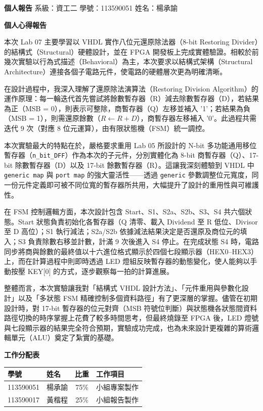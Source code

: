 \documentclass[12pt, a4paper]{article}
\begin{document}
\noindent
\textbf{個人報告} \hfill 系級：資工二 \quad 學號：113590051 \quad 姓名：楊承諭

\vspace{1.5em}
\begin{center}
    {\Large \textbf{個人心得報告}}
\end{center}
\vspace{1em}

本次 Lab 07 主要學習以 VHDL 實作八位元還原除法器（8-bit Restoring Divider）的結構式（Structural）硬體設計，並在 FPGA 開發板上完成實體驗證。相較於前幾次實驗以行為式描述（Behavioral）為主，本次要求以結構式架構（Structural Architecture）連接各個子電路元件，使電路的硬體層次更為明確清晰。

在設計過程中，我深入理解了還原除法演算法（Restoring Division Algorithm）的運作原理：每一輪迭代首先嘗試將餘數暫存器（R）減去除數暫存器（D），若結果為正（MSB = 0），則表示可整除，商暫存器（Q）左移並補入 '1'；若結果為負（MSB = 1），則需還原餘數（$R \leftarrow R + D$），商暫存器左移補入 '0'。此過程共需迭代 9 次（對應 8 位元運算），由有限狀態機（FSM）統一調控。

本次實驗最大的特點在於，嚴格要求重用 Lab 05 所設計的 N-bit 多功能通用移位暫存器（\texttt{n\_bit\_DFF}）作為本次的子元件，分別實體化為 8-bit 商暫存器（Q）、17-bit 除數暫存器（D）以及 17-bit 餘數暫存器（R）。這讓我深刻體驗到 VHDL 中 \texttt{generic map} 與 \texttt{port map} 的強大靈活性——透過 \texttt{generic} 參數調整位元寬度，同一份元件定義即可被不同位寬的暫存器所共用，大幅提升了設計的重用性與可維護性。

在 FSM 控制邏輯方面，本次設計包含 Start、S1、S2a、S2b、S3、S4 共六個狀態。Start 狀態負責初始化各暫存器（Q 清零、載入 Dividend 至 R 低位、Divisor 至 D 高位）；S1 執行減法；S2a/S2b 依據減法結果決定是否還原及商位元的填入；S3 負責除數右移並計數，計滿 9 次後進入 S4 停止。在完成狀態 S4 時，電路同步將商與餘數的最終值以十六進位格式顯示於四個七段顯示器（HEX0–HEX3）上，而在計算過程中則即時透過 LED 燈組反映暫存器的動態變化，使人能夠以手動按壓 KEY[0] 的方式，逐步觀察每一拍的計算進展。

整體而言，本次實驗讓我對「結構式 VHDL 設計方法」、「元件重用與參數化設計」以及「多狀態 FSM 精確控制多個資料路徑」有了更深層的掌握。儘管在初期設計時，對 17-bit 暫存器的位元對齊（MSB 符號位判斷）與狀態機各狀態間資料路徑切換的時序掌握上花費了較多時間思考，但最終燒錄至 FPGA 後，LED 燈號與七段顯示器的結果完全符合預期，實驗成功完成，也為未來設計更複雜的算術邏輯單元（ALU）奠定了紮實的基礎。

\vspace{2em}
\noindent
\textbf{工作分配表}
\vspace{0.5em}

\begin{table}[H]
    \centering
    \begin{tabular}{llcl}
        \toprule
        \textbf{學號} & \textbf{姓名} & \textbf{比重} & \textbf{工作項目} \\ \midrule
        113590051 & 楊承諭 & 75\% & 小組專案製作 \\
        113590017 & 黃楷程 & 25\% & 小組報告製作 \\ \bottomrule
    \end{tabular}
\end{table}
\end{document}
